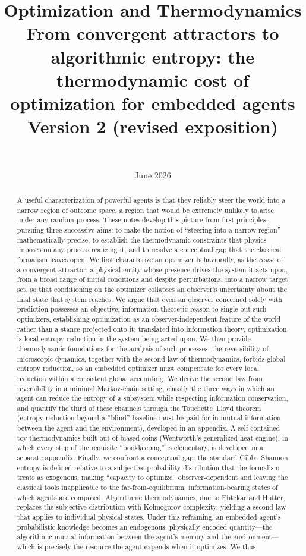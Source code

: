 \documentclass[11pt]{article}
\title{Optimization and Thermodynamics \\[1ex]
{\large From convergent attractors to algorithmic entropy: the thermodynamic cost of optimization for embedded agents} \\[1ex]
{\normalsize Version 2 (revised exposition)}}
\author{
  \authorname{Daniel C}
  \and
  \authorname{Satya Benson}\\
  \affiliation{Williams College}
}
\date{June 2026}
\begin{document}
\maketitle

\begin{abstract}
A useful characterization of powerful agents is that they reliably steer the world into a narrow region of outcome space, a region that would be extremely unlikely to arise under any random process. These notes develop this picture from first principles, pursuing three successive aims: to make the notion of ``steering into a narrow region'' mathematically precise, to establish the thermodynamic constraints that physics imposes on any process realizing it, and to resolve a conceptual gap that the classical formalism leaves open. We first characterize an optimizer behaviorally, as the \emph{cause} of a convergent attractor: a physical entity whose presence drives the system it acts upon, from a broad range of initial conditions and despite perturbations, into a narrow target set, so that conditioning on the optimizer collapses an observer's uncertainty about the final state that system reaches. We argue that even an observer concerned solely with prediction possesses an objective, information-theoretic reason to single out such optimizers, establishing optimization as an observer-independent feature of the world rather than a stance projected onto it; translated into information theory, optimization is local entropy reduction in the system being acted upon. We then provide thermodynamic foundations for the analysis of such processes: the reversibility of microscopic dynamics, together with the second law of thermodynamics, forbids global entropy reduction, so an embedded optimizer must compensate for every local reduction within a consistent global accounting. We derive the second law from reversibility in a minimal Markov-chain setting, classify the three ways in which an agent can reduce the entropy of a subsystem while respecting information conservation, and quantify the third of these channels through the Touchette--Lloyd theorem (entropy reduction beyond a ``blind'' baseline must be paid for in mutual information between the agent and the environment), developed in an appendix. A self-contained toy thermodynamics built out of biased coins (Wentworth's generalized heat engine), in which every step of the requisite ``bookkeeping'' is elementary, is developed in a separate appendix. Finally, we confront a conceptual gap: the standard Gibbs--Shannon entropy is defined relative to a subjective probability distribution that the formalism treats as exogenous, making ``capacity to optimize'' observer-dependent and leaving the classical tools inapplicable to the far-from-equilibrium, information-bearing states of which agents are composed. Algorithmic thermodynamics, due to Ebtekar and Hutter, replaces the subjective distribution with Kolmogorov complexity, yielding a second law that applies to individual physical states. Under this reframing, an embedded agent's probabilistic knowledge becomes an endogenous, physically encoded quantity---the algorithmic mutual information between the agent's memory and the environment---which is precisely the resource the agent expends when it optimizes. We thus 
\end{abstract}
\end{document}
